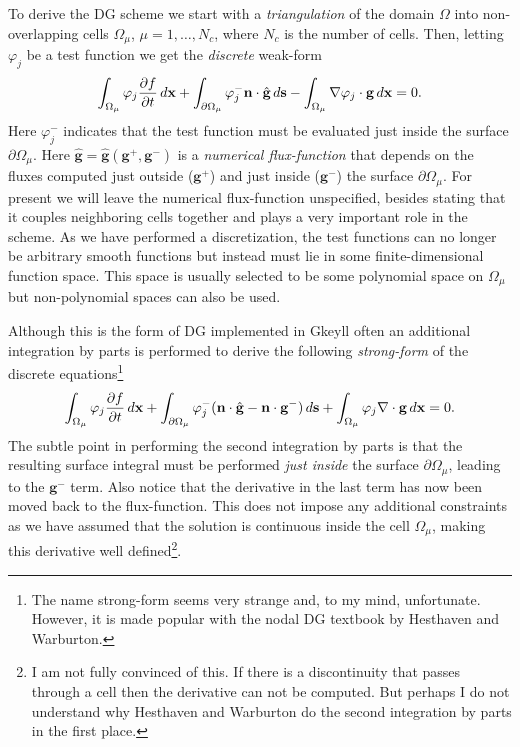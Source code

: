 \documentclass[11pt, reqno]{amsart}
\newcommand{\pfrac}[2]{\frac{\partial #1}{\partial #2}}
\newcommand{\mvec}[1]{\mathbf{#1}}
\theoremstyle{definition}
\begin{document}
To derive the DG scheme we start with a \emph{triangulation} of the
domain $\Omega$ into non-overlapping cells $\Omega_\mu$,
$\mu=1,\ldots,N_c$, where $N_c$ is the number of cells. Then, letting
$\varphi_j$ be a test function we get the \emph{discrete} weak-form
\begin{align}
  \int_{\Omega_\mu} \varphi_j \pfrac{f}{t}\thinspace d\mvec{x} +
  \int_{\partial \Omega_\mu}\varphi_j^-
  \mvec{n}\cdot\hat{\mvec{g}}\thinspace d\mvec{s} - \int_{\Omega_\mu}
  \nabla\varphi_j\cdot\mvec{g}\thinspace d\mvec{x} = 0.
\end{align}
Here $\varphi_j^-$ indicates that the test function must be evaluated
just inside the surface $\partial \Omega_\mu$. Here $\hat{\mvec{g}} =
\hat{\mvec{g}}(\mvec{g}^+,\mvec{g}^-)$ is a \emph{numerical
  flux-function} that depends on the fluxes computed just outside
($\mvec{g}^+$) and just inside ($\mvec{g}^-$) the surface $\partial
\Omega_\mu$.  For present we will leave the numerical flux-function
unspecified, besides stating that it couples neighboring cells
together and plays a very important role in the scheme. As we have
performed a discretization, the test functions can no longer be
arbitrary smooth functions but instead must lie in some
finite-dimensional function space. This space is usually selected to
be some polynomial space on $\Omega_\mu$ but non-polynomial spaces can
also be used.

Although this is the form of DG implemented in Gkeyll often an
additional integration by parts is performed to derive the following
\emph{strong-form} of the discrete equations\footnote{The name
  strong-form seems very strange and, to my mind,
  unfortunate. However, it is made popular with the nodal DG textbook
  by Hesthaven and Warburton.}
\begin{align}
  \int_{\Omega_\mu} \varphi_j \pfrac{f}{t}\thinspace d\mvec{x} +
  \int_{\partial \Omega_\mu}\varphi_j^- 
  (\mvec{n}\cdot\hat{\mvec{g}}-\mvec{n}\cdot\mvec{g}^-)\thinspace
  d\mvec{s} 
  + \int_{\Omega_\mu} \varphi_j\nabla\cdot\mvec{g}\thinspace
  d\mvec{x} = 0.  
\end{align}
The subtle point in performing the second integration by parts is that
the resulting surface integral must be performed \emph{just inside}
the surface $\partial\Omega_\mu$, leading to the $\mvec{g}^-$
term. Also notice that the derivative in the last term has now been
moved back to the flux-function. This does not impose any additional
constraints as we have assumed that the solution is continuous inside
the cell $\Omega_\mu$, making this derivative well defined\footnote{I
  am not fully convinced of this. If there is a discontinuity that
  passes through a cell then the derivative can not be computed. But
  perhaps I do not understand why Hesthaven and Warburton do the
  second integration by parts in the first place.}.
\end{document}
